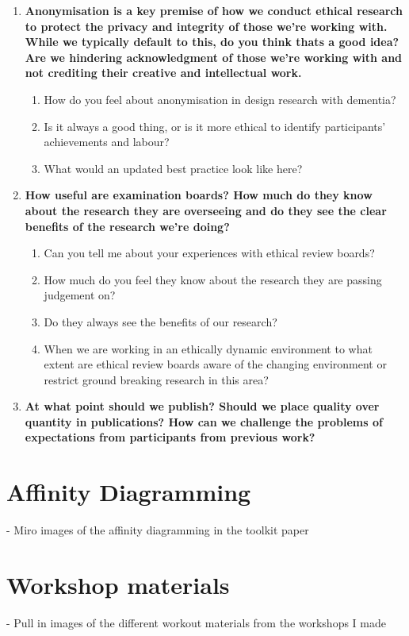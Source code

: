 \begin{enumerate}
    \item \textbf{Anonymisation is a key premise of how we conduct ethical research to protect the privacy and integrity of those we’re working with. While we typically default to this, do you think thats a good idea? Are we hindering acknowledgment of those we’re working with and not crediting their creative and intellectual work.}
    \begin{enumerate}
        \item How do you feel about anonymisation in design research with dementia?
        \item Is it always a good thing, or is it more ethical to identify participants’ achievements and labour?
        \item What would an updated best practice look like here?
    \end{enumerate}

    \item \textbf{How useful are examination boards? How much do they know about the research they are overseeing and do they see the clear benefits of the research we’re doing?}
    \begin{enumerate}
        \item Can you tell me about your experiences with ethical review boards?
        \item How much do you feel they know about the research they are passing judgement on?
        \item Do they always see the benefits of our research?
        \item When we are working in an ethically dynamic environment to what extent are ethical review boards aware of the changing environment or restrict ground breaking research in this area?
    \end{enumerate}
 
    \item \textbf{At what point should we publish? Should we place quality over quantity in publications? How can we challenge the problems of expectations from participants from previous work?}
\end{enumerate}

\section{Affinity Diagramming}
\label{app:AD}
- Miro images of the affinity diagramming in the toolkit paper

\section{Workshop materials}
\label{app:ToolkitMaterials}
- Pull in images of the different workout materials from the workshops I made